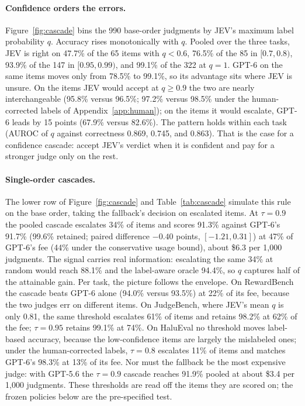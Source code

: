 \documentclass[11pt]{article}
\begin{document}
\paragraph{Confidence orders the errors.}
Figure~\ref{fig:cascade} bins the 990 base-order judgments by JEV's maximum label probability $q$. Accuracy rises monotonically with $q$. Pooled over the three tasks, JEV is right on 47.7\% of the 65 items with $q<0.6$, 76.5\% of the 85 in $[0.7,0.8)$, 93.9\% of the 147 in $[0.95,0.99)$, and 99.1\% of the 322 at $q=1$. GPT-6 on the same items moves only from 78.5\% to 99.1\%, so its advantage sits where JEV is unsure. On the items JEV would accept at $q\geq0.9$ the two are nearly interchangeable (95.8\% versus 96.5\%; 97.2\% versus 98.5\% under the human-corrected labels of Appendix~\ref{app:human}); on the items it would escalate, GPT-6 leads by 15 points (67.9\% versus 82.6\%). The pattern holds within each task (AUROC of $q$ against correctness 0.869, 0.745, and 0.863). That is the case for a confidence cascade: accept JEV's verdict when it is confident and pay for a stronger judge only on the rest.

\paragraph{Single-order cascades.}
The lower row of Figure~\ref{fig:cascade} and Table~\ref{tab:cascade} simulate this rule on the base order, taking the fallback's decision on escalated items. At $\tau=0.9$ the pooled cascade escalates 34\% of items and scores 91.3\% against GPT-6's 91.7\% (99.6\% retained; paired difference $-0.40$ points, $[-1.21,0.31]$) at 47\% of GPT-6's fee (44\% under the conservative usage bound), about \$6.3 per 1,000 judgments. The signal carries real information: escalating the same 34\% at random would reach 88.1\% and the label-aware oracle 94.4\%, so $q$ captures half of the attainable gain. Per task, the picture follows the envelope. On RewardBench the cascade beats GPT-6 alone (94.0\% versus 93.5\%) at 22\% of its fee, because the two judges err on different items. On JudgeBench, where JEV's mean $q$ is only 0.81, the same threshold escalates 61\% of items and retains 98.2\% at 62\% of the fee; $\tau=0.95$ retains 99.1\% at 74\%. On HaluEval no threshold moves label-based accuracy, because the low-confidence items are largely the mislabeled ones; under the human-corrected labels, $\tau=0.8$ escalates 11\% of items and matches GPT-6's 98.3\% at 13\% of its fee. Nor must the fallback be the most expensive judge: with GPT-5.6 the $\tau=0.9$ cascade reaches 91.9\% pooled at about \$3.4 per 1,000 judgments. These thresholds are read off the items they are scored on; the frozen policies below are the pre-specified test.
\end{document}
